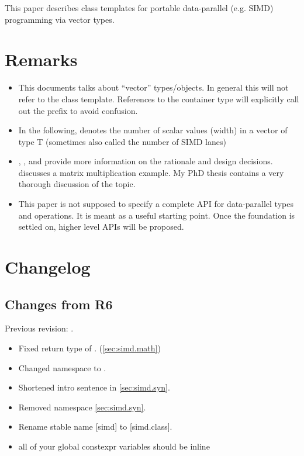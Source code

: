\usepackage{pifont}

\newcommand\foralli[1][]{for all \code i $\in$ \code{[0, #1size())}\xspace}
\newcommand\forallmaskedi[1]{%
  for all \code i
  $\in \{j \in \mathbb{N}_0 | j < \code{size()} ⋀ \code{#1[}j\code{]}\}$%
  \xspace%
}
\newcommand\chck{\item[\color{black}\ensuremath{\checkmark}]}
\newcommand\todo{\item[\color{black}\ding{46}] \color{gray}}
\newcommand\itemheader[1]{\item[] \hfill \textcolor{gray}{\textsc{#1}}}


\begin{wgTitlepage}
  This paper describes class templates for portable data-parallel (e.g. SIMD) programming via vector types.
\end{wgTitlepage}

\pagestyle{scrheadings}
\addtocounter{section}{-1}
\section{Remarks}
\begin{itemize}
  \item This documents talks about “vector” types/objects.
    In general this will not refer to the \std{} class template.
    References to the container type will explicitly call out the  prefix to avoid confusion.
  \item In the following,  denotes the number of scalar values (width) in a vector of type \type T (sometimes also called the number of SIMD lanes)
  \item \parencite{N4184}, \parencite{N4185}, and \parencite{N4395} provide more information on the rationale and design decisions.
    \parencite{N4454} discusses a matrix multiplication example.
    My PhD thesis \parencite{Kretz2015} contains a very thorough discussion of the topic.
  \item This paper is not supposed to specify a complete API for data-parallel types and operations.
    It is meant as a useful starting point.
    Once the foundation is settled on, higher level APIs will be proposed.
\end{itemize}

\section{Changelog}
\subsection{Changes from R6}
Previous revision: \parencite{P0214R6}.
\begin{itemize}
  \item Fixed return type of . (\ref{sec:simd.math})
  \chck Changed namespace to .
  \chck Shortened intro sentence in \ref{sec:simd.syn}.
  \chck Removed  namespace \ref{sec:simd.syn}.
  \chck Rename stable name [simd] to [simd.class].
  \chck all of your global constexpr variables should be inline
\end{itemize}

